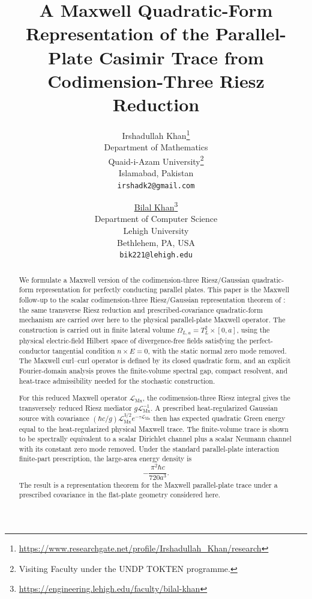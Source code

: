\documentclass[11pt]{article}
\title{A Maxwell Quadratic-Form Representation of the Parallel-Plate Casimir Trace from Codimension-Three Riesz Reduction}
\author{
Irshadullah Khan\thanks{\url{https://www.researchgate.net/profile/Irshadullah_Khan/research}}\\
Department of Mathematics\\
Quaid-i-Azam University\thanks{Visiting Faculty under the UNDP TOKTEN programme.}\\
Islamabad, Pakistan\\
\texttt{irshadk2@gmail.com}
\and
\href{https://orcid.org/0000-0001-8823-6752}{Bilal Khan}\thanks{\url{https://engineering.lehigh.edu/faculty/bilal-khan}}\\
Department of Computer Science\\
Lehigh University\\
Bethlehem, PA, USA\\
\texttt{bik221@lehigh.edu}
}
\date{}
\numberwithin{equation}{section}
\begin{document}
\maketitle

\begin{abstract}
We formulate a Maxwell version of the codimension-three Riesz/Gaussian
quadratic-form representation for perfectly conducting parallel plates.  This
paper is the Maxwell follow-up to the scalar codimension-three
Riesz/Gaussian representation theorem of \cite{KhanKhan2026Scalar}: the same
transverse Riesz reduction and prescribed-covariance quadratic-form mechanism
are carried over here to the physical parallel-plate Maxwell operator.  The
construction is carried out in finite lateral volume
\(\Omega_{L,a}=T_L^2\times[0,a]\), using the physical electric-field Hilbert
space of divergence-free fields satisfying the perfect-conductor tangential
condition \(n\times E=0\), with the static normal zero mode removed.  The
Maxwell curl--curl operator is defined by its closed quadratic form, and an
explicit Fourier-domain analysis proves the finite-volume spectral gap,
compact resolvent, and heat-trace admissibility needed for the stochastic
construction.

For this reduced Maxwell operator \(\mathcal L_{\mathrm{Mx}}\), the
codimension-three Riesz integral gives the transversely reduced Riesz mediator
\(g\mathcal L_{\mathrm{Mx}}^{-1}\).  A prescribed heat-regularized Gaussian
source with covariance
\((\hbar c/g)\mathcal L_{\mathrm{Mx}}^{3/2}e^{-\tau\mathcal L_{\mathrm{Mx}}}\)
then has expected quadratic Green energy equal to the heat-regularized physical
Maxwell trace.  The finite-volume trace is shown to be spectrally equivalent
to a scalar Dirichlet channel plus a scalar Neumann channel with its constant
zero mode removed.  Under the standard parallel-plate interaction finite-part
prescription, the large-area energy density is
\[
    -\frac{\pi^2\hbar c}{720a^3}.
\]
The result is a representation theorem for the Maxwell parallel-plate trace
under a prescribed covariance in the flat-plate geometry considered here.
\end{abstract}

\tableofcontents

\end{document}
